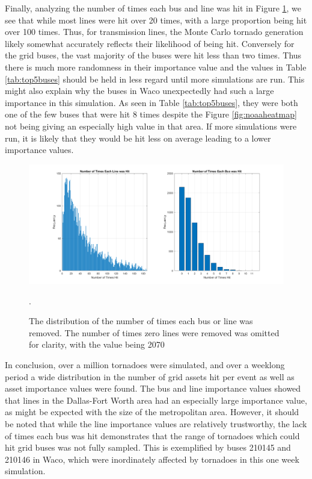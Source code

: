 \documentclass[12pt]{article}
\begin{document}
Finally, analyzing the number of times each bus and line was hit in Figure \ref{fig:Timeseachitemhit}, we see that while most lines were hit over 20 times, with a large proportion being hit over 100 times. Thus, for transmission lines, the Monte Carlo tornado generation likely somewhat accurately reflects their likelihood of being hit. Conversely for the grid buses, the vast majority of the buses were hit less than two times. Thus there is much more randomness in their importance value and the values in Table \ref{tab:top5buses} should be held in less regard until more simulations are run. This might also explain why the buses in Waco unexpectedly had such a large importance in this simulation. As seen in Table \ref{tab:top5buses}, they were both one of the few buses that were hit 8 times despite the Figure \ref{fig:noaaheatmap} not being giving an especially high value in that area. If more simulations were run, it is likely that they would be hit less on average leading to a lower importance values.

\begin{figure}[H]
    \centering %
    \includegraphics[width=\textwidth]{Timeseachitemhit.png}
    \caption[Distribution of the number of times each bus or line was removed]{The distribution of the number of times each bus or line was removed. The number of times zero lines were removed was omitted for clarity, with the value being 2070}.
    \label{fig:Timeseachitemhit}
\end{figure}

In conclusion, over a million tornadoes were simulated, and over a weeklong period a wide distribution in the number of grid assets hit per event as well as asset importance values were found. The bus and line importance values showed that lines in the Dallas-Fort Worth area had an especially large importance value, as might be expected with the size of the metropolitan area. However, it should be noted that while the line importance values are relatively trustworthy, the lack of times each bus was hit demonstrates that the range of tornadoes which could hit grid buses was not fully sampled. This is exemplified by buses 210145 and 210146 in Waco, which were inordinately affected by tornadoes in this one week simulation.
\end{document}
